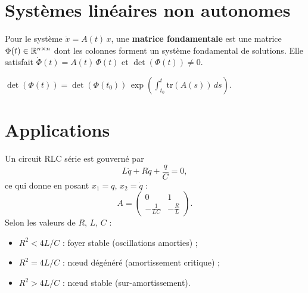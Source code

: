 \section{Syst\`emes lin\'eaires non autonomes}

\begin{definition}
Pour le syst\`eme $\dot{x} = A(t)\, x$, une \textbf{matrice fondamentale}
est une matrice $\Phi(t) \in \mathbb{R}^{n \times n}$ dont les colonnes forment un
syst\`eme fondamental de solutions. Elle satisfait
$\dot{\Phi}(t) = A(t)\, \Phi(t)$ et $\det(\Phi(t)) \neq 0$.
\end{definition}

\begin{theoreme}
$\det(\Phi(t)) = \det(\Phi(t_0))\, \exp\!\left(\int_{t_0}^t \mathrm{tr}(A(s))\, ds\right)$.
\end{theoreme}

\section{Applications}

\begin{exemple}
Un circuit RLC s\'erie est gouvern\'e par
\[
    L\ddot{q} + R\dot{q} + \frac{q}{C} = 0,
\]
ce qui donne en posant $x_1 = q$, $x_2 = \dot{q}$ :
\[
    A = \begin{pmatrix} 0 & 1 \\ -\frac{1}{LC} & -\frac{R}{L} \end{pmatrix}.
\]
Selon les valeurs de $R$, $L$, $C$ :
\begin{itemize}
    \item $R^2 < 4L/C$ : foyer stable (oscillations amorties) ;
    \item $R^2 = 4L/C$ : n\oe ud d\'eg\'en\'er\'e (amortissement critique) ;
    \item $R^2 > 4L/C$ : n\oe ud stable (sur-amortissement).
\end{itemize}
\end{exemple}

